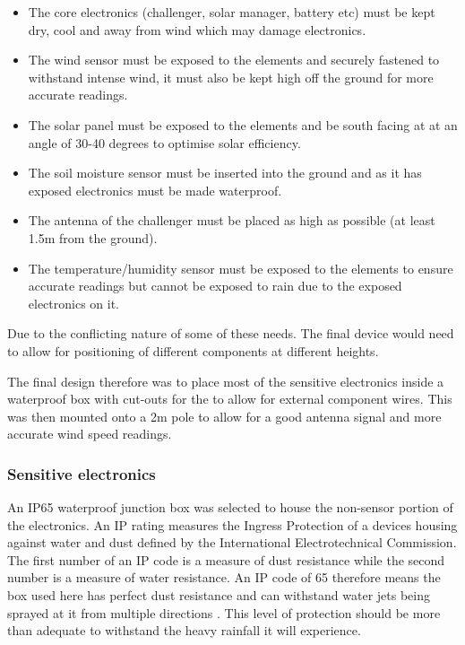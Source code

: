 \begin{itemize}
    \item The core electronics (challenger, solar manager, battery etc) must be
          kept dry, cool and away from wind which may damage electronics.
    \item The wind sensor must be exposed to the elements and securely fastened
          to withstand intense wind, it must also be kept high off the ground
          for more accurate readings.
    \item The solar panel must be exposed to the elements and be south facing at
          at an angle of 30-40 degrees to optimise solar efficiency.
    \item The soil moisture sensor must be inserted into the ground and as it
          has exposed electronics must be made waterproof.
    \item The antenna of the challenger must be placed as high as possible (at
          least 1.5m from the ground).
    \item The temperature/humidity sensor must be exposed to the elements to
          ensure accurate readings but cannot be exposed to rain due to the
          exposed electronics on it.
\end{itemize}

Due to the conflicting nature of some of these needs. The final device would
need to allow for positioning of different components at different heights.

The final design therefore was to place most of the sensitive electronics inside
a waterproof box with cut-outs for the to allow for external component wires.
This was then mounted onto a 2m pole to allow for a good antenna signal and
more accurate wind speed readings.

\subsubsection{Sensitive electronics}

An IP65 waterproof junction box was selected to house the non-sensor portion of
the electronics. An IP rating measures the Ingress Protection of a devices
housing against water and dust defined by the International Electrotechnical
Commission. The first number of an IP code is a measure of dust resistance while
the second number is a measure of water resistance. An IP code of 65 therefore
means the box used here has perfect dust resistance and can withstand water jets
being sprayed at it from multiple directions \cite{wiki-ip}. This level of
protection should be more than adequate to withstand the heavy rainfall it will
experience.


